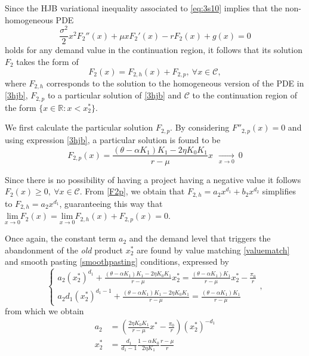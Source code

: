 Since the HJB variational inequality associated to \eqref{eq:3s10} implies that the non-homogeneous PDE 
\begin{equation}
\frac{\sigma^2}{2}x^2F_2''(x)+\mu x F_2'(x) - r F_2(x)+g(x) =0 
\label{3hjb}
\end{equation}
holds for any demand value in the continuation region, it follows that its solution $F_2$ takes the form of
\begin{equation}
F_2(x)=F_{2,h}(x)+F_{2,p}, \  \forall x \in \mathcal{C},
\end{equation}
where $F_{2,h}$ corresponds to the solution to the homogeneous version of the PDE in \eqref{3hjb}, $F_{2,p}$ to a particular solution of \eqref{3hjb} and $\mathcal{C}$ to the continuation region of the form $\{ x \in \mathds{R}: x< x_2^* \}$.

We first calculate the particular solution $F_{2,p}$. By considering $F''_{2,p}(x)=0$ and using expression \eqref{3hjb}, a particular solution is found to be 
\begin{equation}
F_{2,p}(x)=\frac{(\theta-\alpha K_1)K_1-2 \eta K_0 K_1}{r-\mu}x \  \   \xrightarrow[x \rightarrow 0 ]{ } \ 0
	\label{F2p}
\end{equation}


Since there is no possibility of having a project having a negative value it follows $F_2(x) \geq 0, \ \forall x \in \mathcal{C}$. From \ref{F2p}, we obtain that $F_{2,h}=a_2 x^{d_1}+b_2 x^{d_2}$ simplifies to $F_{2,h}=a_2 x^{d_1}$, guaranteeing this way that $\underset{x \to 0}{\text{lim}} F_2(x)=\underset{x \to 0}{\text{lim}} F_{2,h}(x)+F_{2,p}(x)=0$.

Once again, the constant term $a_2$ and the demand level that triggers the abandonment of the \textit{old} product $x_2^*$ are found by value matching \eqref{valuematch} and smooth pasting \eqref{smoothpasting} conditions, expressed by
\begin{equation}
\begin{cases}
a_2(x_2^*)^{d_1}+\frac{(\theta-\alpha K_1)K_1-2 \eta K_0 K_1}{r-\mu}x_2^*=\frac{(\theta-\alpha K_1)K_1}{r-\mu} x_2^* -\frac{\pi_0}{r} \\
a_2 d_1(x_2^*)^{d_1-1}+\frac{(\theta-\alpha K_1)K_1-2 \eta K_0 K_1}{r-\mu}=\frac{(\theta-\alpha K_1)K_1}{r-\mu}
\end{cases},
\end{equation}
from which we obtain
\begin{align}
a_2 &= \left( \frac{2\eta K_0 K_1}{r-\mu}x^*-\frac{\pi_0}{r} \right)(x_2^*)^{-d_1} \nonumber \\
x_2^*&=\frac{d_1}{d_1-1} \frac{1-\alpha K_0}{2 \eta K_1} \frac{r-\mu}{r} \label{3:x2}
\end{align}

